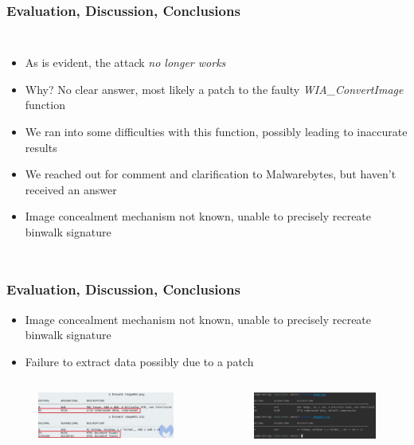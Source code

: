 \documentclass[fleqn]{beamer}
\begin{document}
\begin{frame}
  \frametitle{Evaluation, Discussion, Conclusions}
  \begin{columns}[T]
    \column{\textwidth}
    \begin{itemize}
      \item As is evident, the attack \emph{no longer works}
      \item Why? No clear answer, most likely a patch to the faulty \emph{WIA\_ConvertImage} function
      \item We ran into some difficulties with this function, possibly leading to inaccurate results
      \item We reached out for comment and clarification to Malwarebytes, but haven't received an answer
      \item Image concealment mechanism not known, unable to precisely recreate binwalk signature
    \end{itemize}
  \end{columns}
\end{frame}

\begin{frame}
  \frametitle{Evaluation, Discussion, Conclusions}
  \begin{itemize}
    \item Image concealment mechanism not known, unable to precisely recreate binwalk signature
    \item Failure to extract data possibly due to a patch
  \end{itemize}
  \begin{columns}[T]
    \begin{figure}[H]
      \centering
      \includegraphics[scale=0.33]{images/malwarebytes_binwalk.jpg}
    \end{figure}
    \begin{figure}[H]
      \centering
      \includegraphics[scale=0.33]{images/my_binwalks.png}
    \end{figure}
  \end{columns}
\end{frame}
\end{document}
